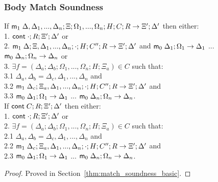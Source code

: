 \subsubsection{Body Match Soundness}

If $\mathsf{m}_1 \; \Delta, \Delta_1, ..., \Delta_n; \Xi; \Omega_1, ..., \Omega_n; H; C; R \rightarrow \Xi'; \Delta'$ then either:\\
1. \hspace{1cm} $\mathsf{cont} \; \cdot; R; \Xi'; \Delta'$ or \\
2. \hspace{1cm} $\mathsf{m}_1 \; \Delta; \Xi, \Delta_1, ..., \Delta_n; \cdot; H; C''; R \rightarrow \Xi'; \Delta'$ and $\mathsf{m}_0 \; \Delta_1; \Omega_1 \rightarrow \Delta_1$ ... $\mathsf{m}_0 \; \Delta_n; \Omega_n \rightarrow \Delta_n$ or \\
3. \hspace{1cm} $\exists f = (\Delta_a; \Delta_b; \Omega_1, ..., \Omega_n; H; \Xi_a) \in C$ such that:\\
3.1 \hspace{2cm} $\Delta_a, \Delta_b = \Delta_c, \Delta_1, ..., \Delta_n$ and \\
3.2 \hspace{2cm} $\mathsf{m}_1 \; \Delta_c; \Xi_a, \Delta_1, ..., \Delta_n; \cdot; H; C''; R \rightarrow \Xi'; \Delta'$ and \\
3.3 \hspace{2cm} $\mathsf{m}_0 \; \Delta_1; \Omega_1 \rightarrow \Delta_1$ ... $\mathsf{m}_0 \; \Delta_n; \Omega_n \rightarrow \Delta_n$.\\

If $\mathsf{cont} \; C; R; \Xi'; \Delta'$ then either:\\
1. \hspace{1cm} $\mathsf{cont} \; \cdot; R; \Xi'; \Delta'$ or \\
2. \hspace{1cm} $\exists f = (\Delta_a; \Delta_b; \Omega_1, ..., \Omega_n; H; \Xi_a) \in C$ such that:\\
2.1 \hspace{2cm} $\Delta_a, \Delta_b = \Delta_c, \Delta_1, ..., \Delta_n$ and \\
2.2 \hspace{2cm} $\mathsf{m}_1 \; \Delta_c; \Xi_a, \Delta_1, ..., \Delta_n; \cdot; H; C''; R \rightarrow \Xi'; \Delta'$ and \\
2.3 \hspace{2cm} $\mathsf{m}_0 \; \Delta_1; \Omega_1 \rightarrow \Delta_1$ ... $\mathsf{m}_0 \; \Delta_n; \Omega_n \rightarrow \Delta_n$.\\

\begin{proof}
Proved in Section~\ref{thm:match_soundness_basic}.
\end{proof}

